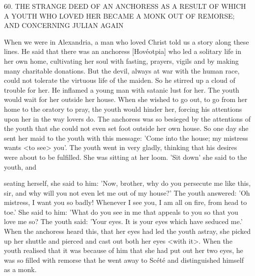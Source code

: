60. THE STRANGE DEED OF AN ANCHORESS
AS A RESULT OF WHICH A YOUTH
WHO LOVED HER BECAME A MONK
OUT OF REMORSE;
AND CONCERNING JULIAN AGAIN

When we were in Alexandria, a man who loved Christ told us a
story along these lines. He said that there was an anchoress
[Hovéotpia] who led a solitary life in her own home, cultivating
her soul with fasting, prayers, vigils and by making many charitable
donations. But the devil, always at war with the human race, could
not tolerate the virtuous life of the maiden. So he stirred up a cloud
of trouble for her. He inflamed a young man with satanic lust for
her. The youth would wait for her outside her house. When she
wished to go out, to go from her home to the oratory to pray, the
youth would hinder her, forcing his attentions upon her in the way
lovers do. The anchoress was so besieged by the attentions of the
youth that she could not even set foot outside her own house. So
one day she sent her maid to the youth with this message: 'Come
into the house; my mistress wants <to see> you'. The youth went in
very gladly, thinking that his desires were about to be fulfilled. She
was sitting at her loom. 'Sit down' she said to the youth, and

seating herself, she said to him: 'Now, brother, why do you
persecute me like this, sir, and why will you not even let me out of
my house?' The youth answered: 'Oh mistress, I want you so badly!
Whenever I see you, I am all on fire, from head to toe.' She said to
him: 'What do you see in me that appeals to you so that you love
me so? The youth said: 'Your eyes. It is your eyes which have
seduced me.' When the anchoress heard this, that her eyes had led
the youth astray, she picked up her shuttle and pierced and cast out
both her eyes <with it>. When the youth realised that it was
because of him that she had put out her two eyes, he was so filled
with remorse that he went away to Scété and distinguished himself
as a monk.

